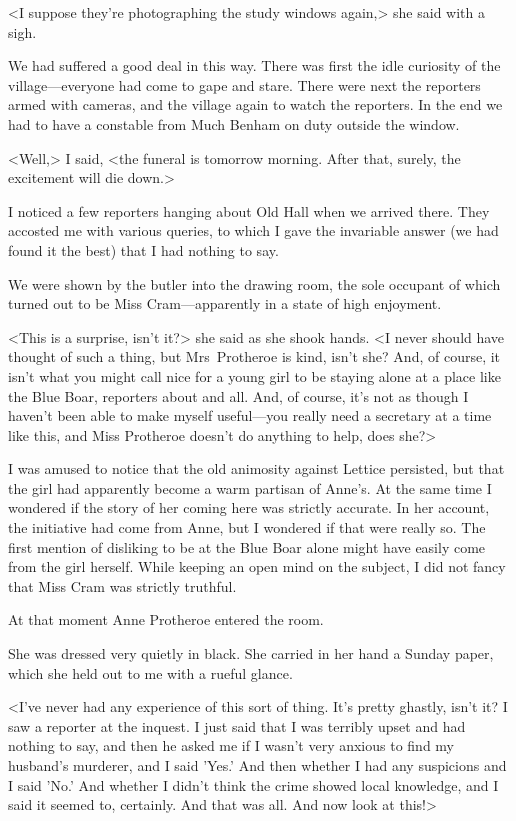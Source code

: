 <I suppose they're photographing the study windows again,> she said with a sigh.

We had suffered a good deal in this way. There was first the idle curiosity of the village—everyone had come to gape and stare. There were next the reporters armed with cameras, and the village again to watch the reporters. In the end we had to have a constable from Much Benham on duty outside the window.

<Well,> I said, <the funeral is tomorrow morning. After that, surely, the excitement will die down.>

I noticed a few reporters hanging about Old Hall when we arrived there. They accosted me with various queries, to which I gave the invariable answer (we had found it the best) that I had nothing to say.

We were shown by the butler into the drawing room, the sole occupant of which turned out to be Miss Cram—apparently in a state of high enjoyment.

<This is a surprise, isn't it?> she said as she shook hands. <I never should have thought of such a thing, but Mrs~Protheroe is kind, isn't she? And, of course, it isn't what you might call nice for a young girl to be staying alone at a place like the Blue Boar, reporters about and all. And, of course, it's not as though I haven't been able to make myself useful—you really need a secretary at a time like this, and Miss Protheroe doesn't do anything to help, does she?>

I was amused to notice that the old animosity against Lettice persisted, but that the girl had apparently become a warm partisan of Anne's. At the same time I wondered if the story of her coming here was strictly accurate. In her account, the initiative had come from Anne, but I wondered if that were really so. The first mention of disliking to be at the Blue Boar alone might have easily come from the girl herself. While keeping an open mind on the subject, I did not fancy that Miss Cram was strictly truthful.

At that moment Anne Protheroe entered the room.

She was dressed very quietly in black. She carried in her hand a Sunday paper, which she held out to me with a rueful glance.

<I've never had any experience of this sort of thing. It's pretty ghastly, isn't it? I saw a reporter at the inquest. I just said that I was terribly upset and had nothing to say, and then he asked me if I wasn't very anxious to find my husband's murderer, and I said 'Yes.' And then whether I had any suspicions and I said 'No.' And whether I didn't think the crime showed local knowledge, and I said it seemed to, certainly. And that was all. And now look at this!>

